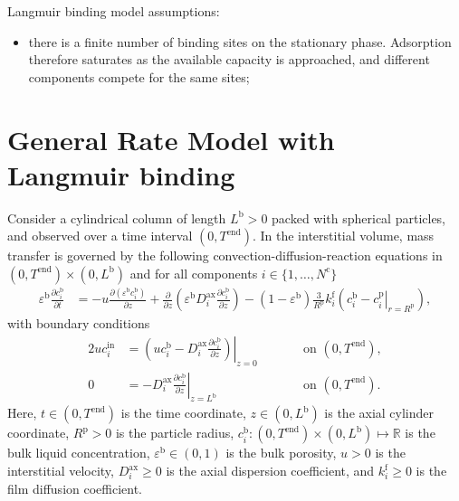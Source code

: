 \documentclass{article}
\begin{document}
Langmuir binding model assumptions:
\begin{itemize}
    \item there is a finite number of binding sites on the stationary phase. Adsorption therefore saturates as the available capacity is approached, and different components compete for the same sites;
\end{itemize}

\section*{General Rate Model with Langmuir binding}
Consider a cylindrical column of length $L^{\mathrm{b}} > 0$ packed with spherical particles, and observed over a time interval $(0, T^{\mathrm{end}})$.
In the interstitial volume, mass transfer is governed by the following convection-diffusion-reaction equations in $(0, T^{\mathrm{end}})\times (0, L^{\mathrm{b}})$ and for all components $i\in\{1, \dots, N^{\mathrm{c}} \}$
\begin{align}
    \varepsilon^{\mathrm{b}} \frac{\partial c^{\mathrm{b}}_{i}}{\partial t}
    &= - u \frac{\partial \left( \varepsilon^{\mathrm{b}} c^{\mathrm{b}}_{i} \right)}{\partial z}
        + \frac{\partial}{\partial z} \left( \varepsilon^{\mathrm{b}} D^{\mathrm{ax}}_{i} \frac{\partial c^{\mathrm{b}}_{i}}{\partial z} \right)
        - \left(1 - \varepsilon^{\mathrm{b}} \right) \frac{3}{R^{\mathrm{p}}} k^{\mathrm{f}}_{i} \left(c^{\mathrm{b}}_{i} - \left. c^{\mathrm{p}}_{i} \right|_{r = R^{\mathrm{p}}} \right),
\end{align}
with boundary conditions
\begin{alignat}{2}
    u c^{\mathrm{in}}_{i}
    &= \left.\left( u c^{\mathrm{b}}_{i} - D^{\mathrm{ax}}_{i} \frac{\partial c^{\mathrm{b}}_{i}}{\partial z}\right)\right|_{z=0}
    & & \qquad\text{on }(0, T^{\mathrm{end}}),
    \\
    0
    &= - D^{\mathrm{ax}}_{i} \left. \frac{\partial c^{\mathrm{b}}_{i}}{\partial z} \right|_{z=L^{\mathrm{b}}}
    & & \qquad\text{on }(0, T^{\mathrm{end}}).
\end{alignat}
Here, $t\in (0, T^{\mathrm{end}})$ is the time coordinate, $z\in (0, L^{\mathrm{b}})$ is the axial cylinder coordinate, $R^{\mathrm{p}}> 0$ is the particle radius, $c^{\mathrm{b}}_{i}\colon (0, T^{\mathrm{end}})\times (0, L^{\mathrm{b}}) \mapsto \mathbb{R}$ is the bulk liquid concentration, $\varepsilon^{\mathrm{b}}\in (0, 1)$ is the bulk porosity, $u> 0$ is the interstitial velocity, $D^{\mathrm{ax}}_{i}\geq 0$ is the axial dispersion coefficient, and $k^{\mathrm{f}}_{i}\geq 0$ is the film diffusion coefficient.
\end{document}
